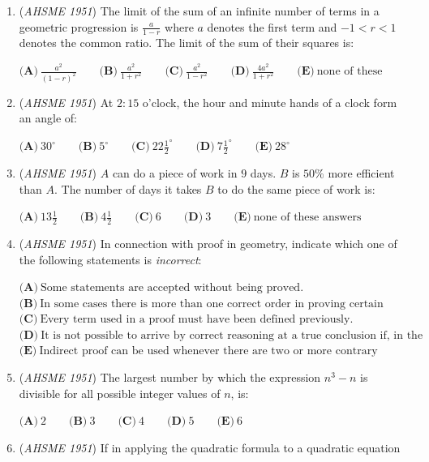 \begin{enumerate}
	\item (\textit{AHSME 1951}) The limit of the sum of an infinite number of terms in a geometric progression is $\frac {a}{1- r}$ where $a$ denotes the first term and $-1 < r < 1$ denotes the common ratio. The limit of the sum of their squares is:


 $\textbf{(A)}\ \frac {a^2}{(1 -r)^2} \qquad\textbf{(B)}\ \frac {a^2}{1 + r^2} \qquad\textbf{(C)}\ \frac {a^2}{1 - r^2} \qquad\textbf{(D)}\ \frac {4a^2}{1+ r^2} \qquad\textbf{(E)}\ \text{none of these}$


	\item (\textit{AHSME 1951}) At $2: 15$ o'clock, the hour and minute hands of a clock form an angle of:


 $\textbf{(A)}\ 30^{\circ} \qquad\textbf{(B)}\ 5^{\circ} \qquad\textbf{(C)}\ 22\frac {1}{2}^{\circ} \qquad\textbf{(D)}\ 7\frac {1}{2} ^{\circ} \qquad\textbf{(E)}\ 28^{\circ}$


	\item (\textit{AHSME 1951}) $A$ can do a piece of work in $9$ days. $B$ is $50\%$ more efficient than $A$. The number of days it takes $B$ to do the same piece of work is:


 $\textbf{(A)}\ 13\frac {1}{2} \qquad\textbf{(B)}\ 4\frac {1}{2} \qquad\textbf{(C)}\ 6 \qquad\textbf{(D)}\ 3 \qquad\textbf{(E)}\ \text{none of these answers}$


	\item (\textit{AHSME 1951}) In connection with proof in geometry, indicate which one of the following statements is \textit{incorrect}: 


 $\textbf{(A)}\ \text{Some statements are accepted without being proved.}$
$\textbf{(B)}\ \text{In some cases there is more than one correct order in proving certain propositions.}$
$\textbf{(C)}\ \text{Every term used in a proof must have been defined previously.}$
$\textbf{(D)}\ \text{It is not possible to arrive by correct reasoning at a true conclusion if, in the given, there is an untrue proposition.}$
$\textbf{(E)}\ \text{Indirect proof can be used whenever there are two or more contrary propositions.}$


	\item (\textit{AHSME 1951}) The largest number by which the expression $n^3-n$ is divisible for all possible integer values of $n$, is: 


 $\textbf{(A)}\ 2\qquad\textbf{(B)}\ 3\qquad\textbf{(C)}\ 4\qquad\textbf{(D)}\ 5\qquad\textbf{(E)}\ 6$


	\item (\textit{AHSME 1951}) If in applying the quadratic formula to a quadratic equation



\end{enumerate}
